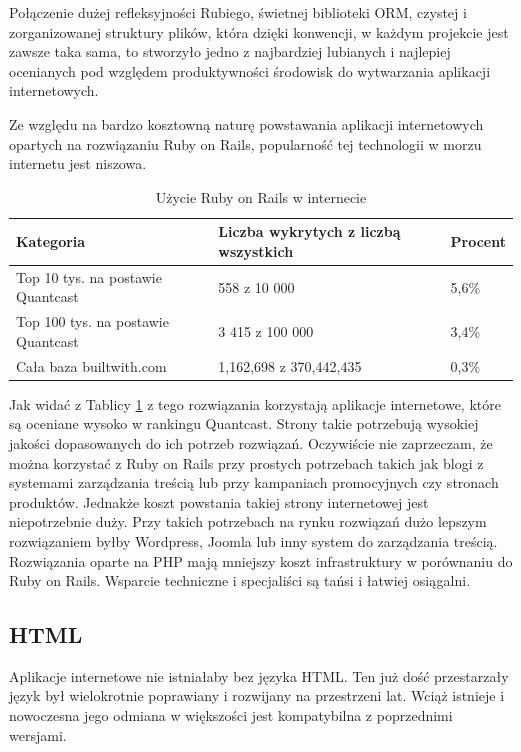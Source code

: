 
Połączenie dużej refleksyjności Rubiego, świetnej biblioteki ORM, czystej i zorganizowanej struktury plików, która dzięki konwencji, w każdym projekcie jest zawsze taka sama, to stworzyło jedno z najbardziej lubianych i najlepiej ocenianych pod względem produktywności środowisk do wytwarzania aplikacji internetowych.

Ze względu na bardzo kosztowną naturę powstawania aplikacji internetowych opartych na rozwiązaniu Ruby on Rails, popularność tej technologii w morzu internetu jest niszowa.\cite{TrendsBuiltWithRails}

\begin{table}
\caption{Użycie Ruby on Rails w internecie}
\label{table:rubyusage}
\begin{tabular}{ |l|l|l|  }
\hline
Kategoria & Liczba wykrytych z liczbą wszystkich & Procent \\
\hline
\hline
Top 10 tys. na postawie Quantcast & 558 z 10 000 & 5,6\% \\
\hline
Top 100 tys. na postawie Quantcast & 3 415 z 100 000 & 3,4\% \\
\hline
Cała baza builtwith.com & 1,162,698 z 370,442,435 & 0,3\% \\
\hline
\end{tabular}
\end{table}

Jak widać z Tablicy \ref{table:rubyusage} z tego rozwiązania korzystają aplikacje internetowe, które są oceniane wysoko w rankingu Quantcast. Strony takie potrzebują wysokiej jakości dopasowanych do ich potrzeb rozwiązań. Oczywiście nie zaprzeczam, że można korzystać z Ruby on Rails przy prostych potrzebach takich jak blogi z systemami zarządzania treścią lub przy kampaniach promocyjnych czy stronach produktów. Jednakże koszt powstania takiej strony internetowej jest niepotrzebnie duży. Przy takich potrzebach na rynku rozwiązań dużo lepszym rozwiązaniem byłby Wordpress, Joomla lub inny system do zarządzania treścią. Rozwiązania oparte na PHP mają mniejszy koszt infrastruktury w porównaniu do Ruby on Rails. Wsparcie techniczne i specjaliści są tańsi i łatwiej osiągalni.

\subsection{HTML}
Aplikacje internetowe nie istniałaby bez języka HTML. Ten już dość przestarzały język był wielokrotnie poprawiany i rozwijany na przestrzeni lat. Wciąż istnieje i nowoczesna jego odmiana w większości jest kompatybilna z poprzednimi wersjami.

